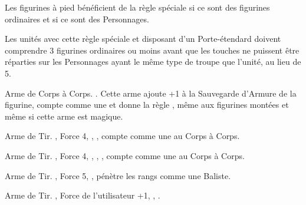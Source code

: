 \newcommand{\smashrule}{%
Choisissez une figurine dans l'unité sélectionnée et en contact socle à socle avec le Géant. Cette figurine subit une blessure avec \armourpiercing{6}. Si la figurine n'a pas encore attaqué, elle ne peut pas le faire au cours de cette manche. Si la figurine a déjà réalisé ses attaques, elle ne pourra pas attaquer au cours du tour de  joueur à venir.
}







\startarmyspecialrules

\armyspecialruleentry{\sonsoftheavalanche}

Les figurines à pied bénéficient de la règle spéciale  si ce sont des figurines ordinaires et  si ce sont des Personnages.


\armyspecialruleentry{\scraplinglookout}

Les unités avec cette règle spéciale et disposant d'un Porte-étendard doivent comprendre 3 figurines ordinaires ou moins avant que les touches ne puissent être réparties sur les Personnages ayant le même type de troupe que l'unité, au lieu de 5.

\closearmyspecialrules

\vspace*{1.5cm}
\startarmyarmoury

\startitemlistonecol

\listitemonecol{\ironfist} Arme de Corps à Corps. \requirestwohands{}. Cette arme ajoute +1 à la Sauvegarde d'Armure de la figurine, compte comme une \pw{} et donne la règle \parry{}, même aux figurines montées et même si cette arme est magique.

\listitemonecol{\ogrepistol} Arme de Tir. , Force 4, \quicktofire{}, , compte comme une \pw{} au Corps à Corps.

\listitemonecol{\braceofogrepistols} Arme de Tir. , Force 4, \quicktofire{}, , , compte comme une \pw{} au Corps à Corps.

\listitemonecol{\ogrecrossbow} Arme de Tir. , Force 5, , pénètre les rangs comme une Baliste.

\listitemonecol{\huntingspear} Arme de Tir. , Force de l'utilisateur +1, \quicktofire{}, .

\enditemlistonecol

